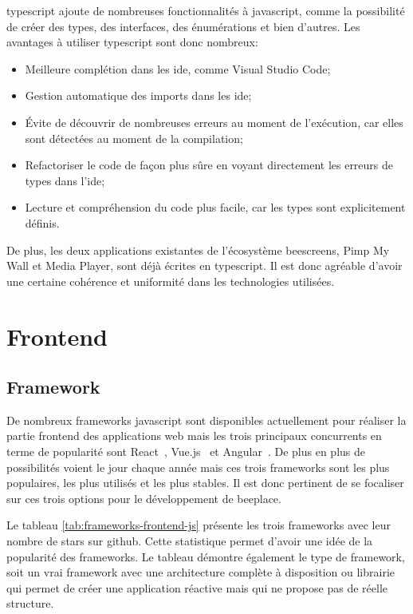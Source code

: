 \gls{typescript} ajoute de nombreuses fonctionnalités à \gls{javascript}, comme la possibilité de créer des types, des interfaces, des énumérations et bien d'autres. Les avantages à utiliser \gls{typescript} sont donc nombreux:

\begin{itemize}
  \item Meilleure complétion dans les \gls{ide}, comme Visual Studio Code;
  \item Gestion automatique des imports dans les \gls{ide};
  \item Évite de découvrir de nombreuses erreurs au moment de l'exécution, car elles sont détectées au moment de la compilation;
  \item Refactoriser le code de façon plus sûre en voyant directement les erreurs de types dans l'\gls{ide};
  \item Lecture et compréhension du code plus facile, car les types sont explicitement définis.
\end{itemize}

De plus, les deux applications existantes de l'écosystème \gls{beescreens}, Pimp My Wall et Media Player, sont déjà écrites en \gls{typescript}. Il est donc agréable d'avoir une certaine cohérence et uniformité dans les technologies utilisées.

\section{Frontend}

\subsection{Framework}

De nombreux frameworks \gls{javascript} sont disponibles actuellement pour réaliser la partie frontend des applications web mais les trois principaux concurrents en terme de popularité sont React~\cite{react}, Vue.js~\cite{vue} et Angular~\cite{angular}. De plus en plus de possibilités voient le jour chaque année mais ces trois frameworks sont les plus populaires, les plus utilisés et les plus stables. Il est donc pertinent de se focaliser sur ces trois options pour le développement de \gls{beeplace}.

Le tableau \ref{tab:frameworks-frontend-js} présente les trois frameworks avec leur nombre de stars sur \gls{github}. Cette statistique permet d'avoir une idée de la popularité des frameworks. Le tableau démontre également le type de framework, soit un vrai framework avec une architecture complète à disposition ou librairie qui permet de créer une application réactive mais qui ne propose pas de réelle structure.

